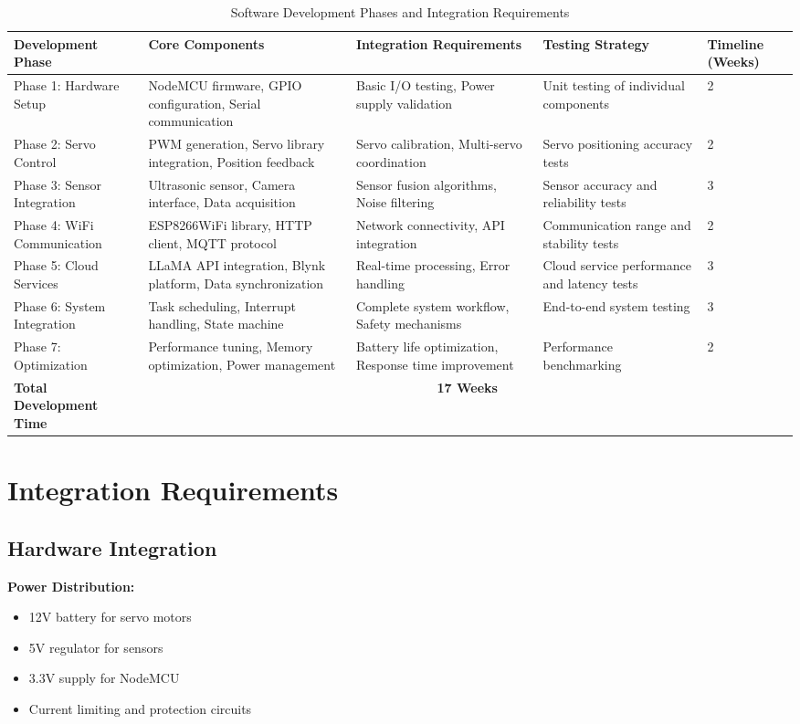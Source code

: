 \begin{table}[h!]
\centering
\caption{Software Development Phases and Integration Requirements}
\label{tab:software_development}
\begin{tabular}{|l|p{3cm}|p{3.5cm}|p{2.5cm}|p{2.5cm}|}
\hline
\textbf{Development Phase} & \textbf{Core Components} & \textbf{Integration Requirements} & \textbf{Testing Strategy} & \textbf{Timeline (Weeks)} \\
\hline
Phase 1: Hardware Setup & NodeMCU firmware, GPIO configuration, Serial communication & Basic I/O testing, Power supply validation & Unit testing of individual components & 2 \\
\hline
Phase 2: Servo Control & PWM generation, Servo library integration, Position feedback & Servo calibration, Multi-servo coordination & Servo positioning accuracy tests & 2 \\
\hline
Phase 3: Sensor Integration & Ultrasonic sensor, Camera interface, Data acquisition & Sensor fusion algorithms, Noise filtering & Sensor accuracy and reliability tests & 3 \\
\hline
Phase 4: WiFi Communication & ESP8266WiFi library, HTTP client, MQTT protocol & Network connectivity, API integration & Communication range and stability tests & 2 \\
\hline
Phase 5: Cloud Services & LLaMA API integration, Blynk platform, Data synchronization & Real-time processing, Error handling & Cloud service performance and latency tests & 3 \\
\hline
Phase 6: System Integration & Task scheduling, Interrupt handling, State machine & Complete system workflow, Safety mechanisms & End-to-end system testing & 3 \\
\hline
Phase 7: Optimization & Performance tuning, Memory optimization, Power management & Battery life optimization, Response time improvement & Performance benchmarking & 2 \\
\hline
\textbf{Total Development Time} & \multicolumn{4}{|c|}{\textbf{17 Weeks}} \\
\hline
\end{tabular}
\end{table}

\section{Integration Requirements}

\subsection{Hardware Integration}
\textbf{Power Distribution:}
\begin{itemize}
\item 12V battery for servo motors
\item 5V regulator for sensors
\item 3.3V supply for NodeMCU
\item Current limiting and protection circuits
\end{itemize}

